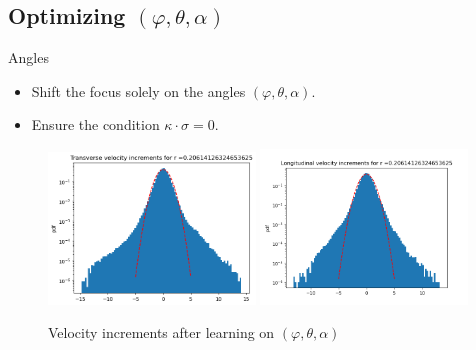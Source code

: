 \documentclass[11pt]{beamer}
\begin{document}
\subsection{Optimizing $(\varphi,\theta,\alpha)$}
\begin{frame}{Angles}
  \begin{itemize}
    \item Shift the focus solely on the angles $(\varphi,\theta,\alpha)$.
    \item Ensure the condition $\kappa\cdot\sigma=0$.
  \end{itemize}
  \begin{figure}
    \centering
    \includegraphics[width=0.49\textwidth]{illustrations/TransVelIncrAngles.png}
    \includegraphics[width=0.49\textwidth]{illustrations/LongVelIncrAngles.png}
    \caption{Velocity increments after learning on $(\varphi,\theta,\alpha)$}
  \end{figure}
\end{frame}
\end{document}
